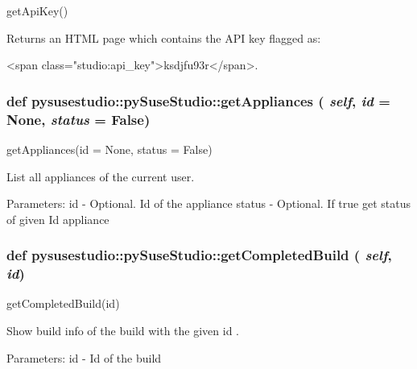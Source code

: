 \label{classpysusestudio_1_1py_suse_studio_ada8fe51f723f7ccf7c7f2fe618281150}
\begin{DoxyVerb}getApiKey()

        Returns an HTML page which contains the API key flagged as:

            <span class="studio:api_key">ksdjfu93r</span>. 
            
\end{DoxyVerb}
 \hypertarget{classpysusestudio_1_1py_suse_studio_afc468bc6f14f91cc718159d0118562f9}{
\subsubsection[{getAppliances}]{\setlength{\rightskip}{0pt plus 5cm}def pysusestudio::pySuseStudio::getAppliances ( {\em self}, \/   {\em id} = {\ttfamily None}, \/   {\em status} = {\ttfamily False})}}
\label{classpysusestudio_1_1py_suse_studio_afc468bc6f14f91cc718159d0118562f9}
\begin{DoxyVerb}getAppliances(id = None, status = False)

        List all appliances of the current user.  
            
            Parameters:
id - Optional. Id of the appliance
status - Optional. If true get status of given Id appliance

\end{DoxyVerb}
 \hypertarget{classpysusestudio_1_1py_suse_studio_afea5cfcc56e614dfc6b78f8d79f8ac4d}{
\subsubsection[{getCompletedBuild}]{\setlength{\rightskip}{0pt plus 5cm}def pysusestudio::pySuseStudio::getCompletedBuild ( {\em self}, \/   {\em id})}}
\label{classpysusestudio_1_1py_suse_studio_afea5cfcc56e614dfc6b78f8d79f8ac4d}
\begin{DoxyVerb}getCompletedBuild(id)

       Show build info of the build with the given id .
        
            Parameters:
id - Id of the build

\end{DoxyVerb}
